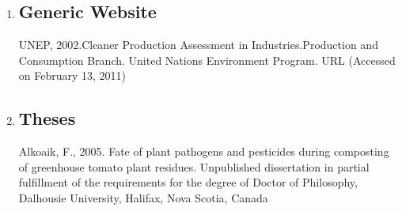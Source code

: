 \documentclass[fleqn,10pt]{thescipub} %
\begin{document}
\begin{enumerate}
\item \subsection{Generic Website}
UNEP, 2002.Cleaner Production Assessment in Industries.Production and Consumption Branch. United Nations Environment Program. {URL} (Accessed on February 13, 2011)
\item \subsection{Theses}
Alkoaik, F., 2005. Fate of plant pathogens and pesticides during composting of greenhouse tomato plant residues. Unpublished dissertation in partial fulfillment of the requirements for the degree of Doctor of Philosophy, Dalhousie University, Halifax, Nova Scotia, Canada
\end{enumerate}

\setlength{\bibsep}{0.5pt} %
 





\end{document}
